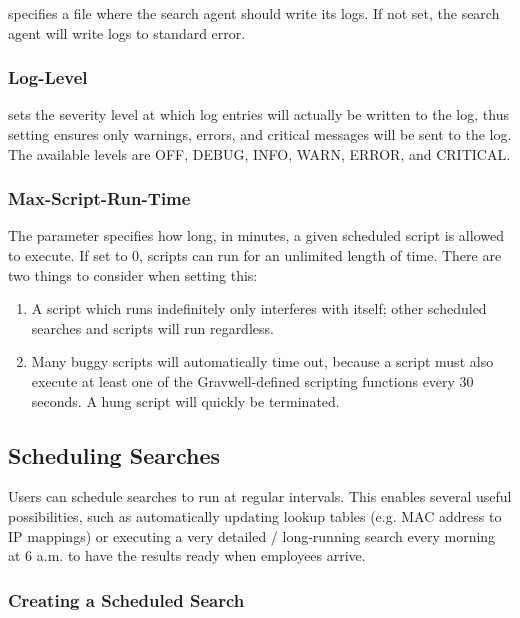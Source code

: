  specifies a file where the search agent should write its
logs. If not set, the search agent will write logs to standard error.

\subsubsection{Log-Level}

 sets the severity level at which log entries will actually be
written to the log, thus setting  ensures only warnings,
errors, and critical messages will be sent to the log. The available
levels are OFF, DEBUG, INFO, WARN, ERROR, and CRITICAL.

\subsubsection{Max-Script-Run-Time}

The  parameter specifies how long, in minutes, a
given scheduled script is allowed to execute. If set to 0, scripts can
run for an unlimited length of time. There are two things to consider
when setting this:

\begin{enumerate}
\tightlist
\item
  A script which runs indefinitely only interferes with itself; other
  scheduled searches and scripts will run regardless.
\item
  Many buggy scripts will automatically time out, because a script must
  also execute at least one of the Gravwell-defined
  scripting functions every 30 seconds. A hung script will quickly
  be terminated.
\end{enumerate}


\subsection{Scheduling Searches}
Users can schedule searches to run at regular intervals. This enables
several useful possibilities, such as automatically updating lookup
tables (e.g. MAC address to IP mappings) or executing a very detailed /
long-running search every morning at 6 a.m. to have the results ready
when employees arrive.

\subsubsection{Creating a Scheduled Search}


